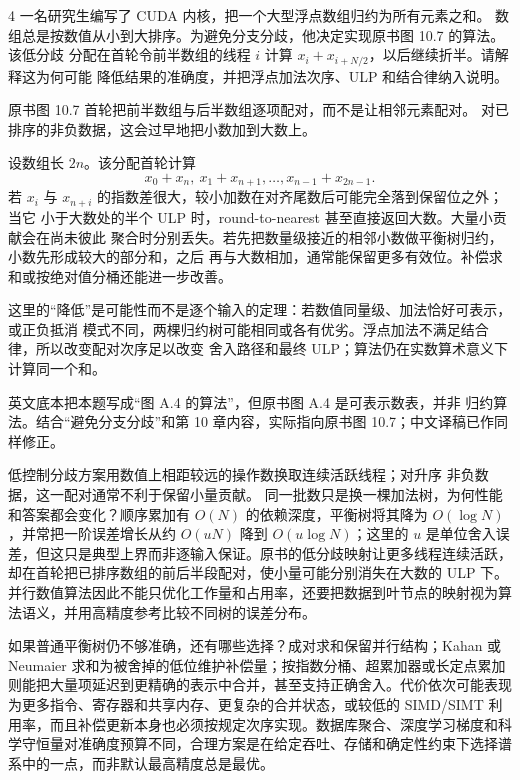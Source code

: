 \begin{solutionexercise}{4}
\problemheading 一名研究生编写了 CUDA 内核，把一个大型浮点数组归约为所有元素之和。
数组总是按数值从小到大排序。为避免分支分歧，他决定实现原书图 10.7 的算法。该低分歧
分配在首轮令前半数组的线程 $i$ 计算 $x_i+x_{i+N/2}$，以后继续折半。请解释这为何可能
降低结果的准确度，并把浮点加法次序、ULP 和结合律纳入说明。

\approachheading 原书图 10.7 首轮把前半数组与后半数组逐项配对，而不是让相邻元素配对。
对已排序的非负数据，这会过早地把小数加到大数上。

\answerheading 设数组长 $2n$。该分配首轮计算
\[
  x_0+x_n,\ x_1+x_{n+1},\ldots,x_{n-1}+x_{2n-1}.
\]
若 $x_i$ 与 $x_{n+i}$ 的指数差很大，较小加数在对齐尾数后可能完全落到保留位之外；当它
小于大数处的半个 ULP 时，round-to-nearest 甚至直接返回大数。大量小贡献会在尚未彼此
聚合时分别丢失。若先把数量级接近的相邻小数做平衡树归约，小数先形成较大的部分和，之后
再与大数相加，通常能保留更多有效位。补偿求和或按绝对值分桶还能进一步改善。

这里的“降低”是可能性而不是逐个输入的定理：若数值同量级、加法恰好可表示，或正负抵消
模式不同，两棵归约树可能相同或各有优劣。浮点加法不满足结合律，所以改变配对次序足以改变
舍入路径和最终 ULP；算法仍在实数算术意义下计算同一个和。

\editorialnote 英文底本把本题写成“图 A.4 的算法”，但原书图 A.4 是可表示数表，并非
归约算法。结合“避免分支分歧”和第 10 章内容，实际指向原书图 10.7；中文译稿已作同样修正。

\conclusionheading 低控制分歧方案用数值上相距较远的操作数换取连续活跃线程；对升序
非负数据，这一配对通常不利于保留小量贡献。
\discussionheading
{}
同一批数只是换一棵加法树，为何性能和答案都会变化？顺序累加有 $O(N)$ 的依赖深度，平衡树将其降为 $O(\log N)$，并常把一阶误差增长从约 $O(uN)$ 降到 $O(u\log N)$；这里的 $u$ 是单位舍入误差，但这只是典型上界而非逐输入保证。原书的低分歧映射让更多线程连续活跃，却在首轮把已排序数组的前后半段配对，使小量可能分别消失在大数的 ULP 下。并行数值算法因此不能只优化工作量和占用率，还要把数据到叶节点的映射视为算法语义，并用高精度参考比较不同树的误差分布。

如果普通平衡树仍不够准确，还有哪些选择？成对求和保留并行结构；Kahan 或 Neumaier 求和为被舍掉的低位维护补偿量；按指数分桶、超累加器或长定点累加则能把大量项延迟到更精确的表示中合并，甚至支持正确舍入。代价依次可能表现为更多指令、寄存器和共享内存、更复杂的合并状态，或较低的 SIMD/SIMT 利用率，而且补偿更新本身也必须按规定次序实现。数据库聚合、深度学习梯度和科学守恒量对准确度预算不同，合理方案是在给定吞吐、存储和确定性约束下选择谱系中的一点，而非默认最高精度总是最优。


\end{solutionexercise}
